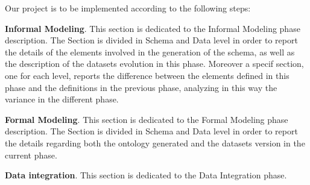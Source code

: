 Our project is to be implemented according to the following steps:
~\\
\item
 \textbf{Informal Modeling}. This section is dedicated to the Informal Modeling phase description.  The Section is divided in Schema and Data level in order to report the details of the elements involved in the generation of the schema, as well as the description of the datasets evolution in this phase.  Moreover a specif section, one for each level, reports the difference between the elements defined in this phase and the definitions in the previous phase, analyzing in this way the variance in the different phase.
 ~\\
 \item
 \textbf{Formal Modeling}. This section is dedicated to the Formal Modeling phase description.  The Section is divided in Schema and Data level in order to report the details regarding both the ontology generated and the datasets version in the current phase.
 ~\\
 \item  
 \textbf{Data integration}. This section is dedicated to the Data Integration phase.